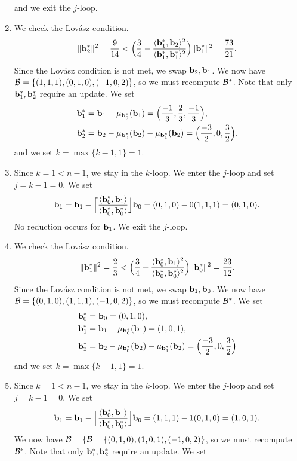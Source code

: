 \documentclass[a4paper,12pt]{article}
\begin{document}
\begin{app}
\begin{enumerate}
        and we exit the $j$-loop.
    \item We check the Lov\'asz condition. 
        $$\|\mathbf{b}_2^{*}\|^2 = \frac{9}{14} < \Big(\frac{3}{4} - \frac{\langle \mathbf{b}_{1}^{*}, \mathbf{b}_{2} \rangle^{2}}{\langle \mathbf{b}_{1}^{*}, \mathbf{b}_{1}^{*} \rangle^{2}}\Big)\|\mathbf{b}_{1}^*\|^2 =  \frac{73}{21}. $$
        Since the Lov\'asz condition is not met, we swap $\mathbf{b}_2, \mathbf{b}_1$. We now have $\mathcal{B} = \lbrace (1,1,1), (0,1,0), (-1,0,2)\rbrace$, so we must recompute $\mathcal{B}^*$. Note that only $\mathbf{b}_1^{*}, \mathbf{b}_2^{*}$ require an update. We set 
        \begin{align*}
            \mathbf{b}_1^{*} &= \mathbf{b}_1 - \mu_{\mathbf{b}_0^*}(\mathbf{b}_1) = \Big(\frac{-1}{3}, \frac{2}{3}, \frac{-1}{3}\Big) , \\
            \mathbf{b}_2^{*} &= \mathbf{b}_2 - \mu_{\mathbf{b}_0^*}(\mathbf{b}_2) - \mu_{\mathbf{b}_1^*}(\mathbf{b}_2) = \Big(\frac{-3}{2},0,\frac{3}{2}\Big).
        \end{align*}
        and we set $k = \max\lbrace k-1, 1\rbrace = 1$. 
    \item Since $k = 1 < n-1$, we stay in the $k$-loop. We enter the $j$-loop and set $j = k-1 = 0$. We set 
        $$ \mathbf{b}_1 = \mathbf{b}_1 - \Big\lceil \frac{\langle\mathbf{b}_0^{*},\mathbf{b}_1\rangle}{\langle\mathbf{b}_0^{*},\mathbf{b}_0^{*}\rangle} \Big\rfloor\mathbf{b}_0 = (0,1,0) - 0(1,1,1) = (0,1,0). $$ No reduction occurs for $\mathbf{b}_1$. We exit the $j$-loop.
    \item We check the Lov\'asz condition. $$\|\mathbf{b}_1^*\|^2 = \frac{2}{3} < \Big(\frac{3}{4} - \frac{\langle    \mathbf{b}_{0}^{*}, \mathbf{b}_{1} \rangle^{2}}{\langle \mathbf{b}_{0}^{*}, \mathbf{b}_{0}^{*} \rangle^{2}}\Big)\|\mathbf{b}_{0}^*\|^2 = \frac{23}{12}.$$ Since the Lov\'asz condition is not met, we swap $\mathbf{b}_1, \mathbf{b}_0$. We now have $\mathcal{B} = \lbrace (0,1,0), (1,1,1), (-1,0,2)\rbrace$, so we must recompute $\mathcal{B}^*$. We set 
    \begin{align*}
        \mathbf{b}_0^{*} &= \mathbf{b}_0 = (0,1,0), \\ 
        \mathbf{b}_1^{*} &= \mathbf{b}_1 - \mu_{\mathbf{b}_0^*}(\mathbf{b}_1) = (1,0,1), \\
        \mathbf{b}_2^{*} &= \mathbf{b}_2 - \mu_{\mathbf{b}_0^*}(\mathbf{b}_2) - \mu_{\mathbf{b}_1^*}(\mathbf{b}_2) = \Big(\frac{-3}{2},0,\frac{3}{2}\Big)
    \end{align*}
    and we set $k = \max\lbrace k-1, 1\rbrace = 1$. 
    \item Since $k = 1 < n-1$, we stay in the $k$-loop. We enter the $j$-loop and set $j = k-1 = 0$. We set
        $$ \mathbf{b}_1 = \mathbf{b}_1 - \Big\lceil \frac{\langle\mathbf{b}_0^{*},\mathbf{b}_1\rangle}{\langle\mathbf{b}_0^{*},\mathbf{b}_0^{*}\rangle} \Big\rfloor\mathbf{b}_0 = (1,1,1) - 1(0,1,0) = (1,0,1). $$
        We now have $\mathcal{B} = \lbrace \mathcal{B} = \lbrace (0,1,0), (1,0,1), (-1,0,2) \rbrace$, so we must recompute $\mathcal{B}^*$. Note that only $\mathbf{b}_1^{*}, \mathbf{b}_2^{*}$ require an update. We set 

\end{enumerate}
\end{app}
\end{document}
